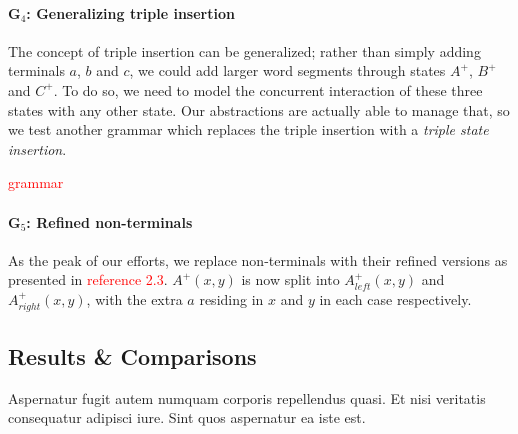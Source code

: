 \documentclass[nonatbib,numbers,10pt]{sigplanconf}
\newcommand\todo[1]{\textcolor{red}{#1}}
\begin{document}
\paragraph{G$_4$: Generalizing triple insertion}
The concept of triple insertion can be generalized; rather than simply adding terminals $a$, $b$ and $c$, we could add larger word segments through states $A^{+}$, $B^{+}$ and $C^{+}$. To do so, we need to model the concurrent interaction of these three states with any other state. Our abstractions are actually able to manage that, so we test another grammar which replaces the triple insertion with a \textit{triple state insertion}.

\todo{grammar}

\paragraph{G$_5$: Refined non-terminals}
As the peak of our efforts, we replace non-terminals with their refined versions as presented in \todo{reference 2.3}. $A^{+}(x,y)$ is now split into $A^{+}_{left}(x,y)$ and $A^{+}_{right}(x,y)$, with the extra $a$ residing in $x$ and $y$ in each case respectively.
\subsection{Results \& Comparisons}
Aspernatur fugit autem numquam corporis repellendus quasi. Et nisi veritatis consequatur adipisci iure. Sint quos aspernatur ea iste est.
\end{document}
